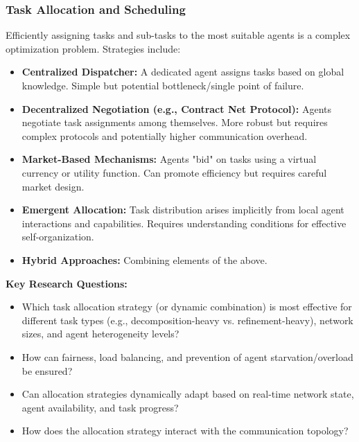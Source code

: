 \documentclass[12pt]{amsart}
\begin{document}
\subsubsection{Task Allocation and Scheduling}
\label{subsubsec:task_allocation}
Efficiently assigning tasks and sub-tasks to the most suitable agents is a complex optimization problem. Strategies include:
\begin{itemize}[leftmargin=*]
    \item \textbf{Centralized Dispatcher:} A dedicated agent assigns tasks based on global knowledge. Simple but potential bottleneck/single point of failure.
    \item \textbf{Decentralized Negotiation (e.g., Contract Net Protocol):} Agents negotiate task assignments among themselves. More robust but requires complex protocols and potentially higher communication overhead.
    \item \textbf{Market-Based Mechanisms:} Agents "bid" on tasks using a virtual currency or utility function. Can promote efficiency but requires careful market design.
    \item \textbf{Emergent Allocation:} Task distribution arises implicitly from local agent interactions and capabilities. Requires understanding conditions for effective self-organization.
    \item \textbf{Hybrid Approaches:} Combining elements of the above.
\end{itemize}
\textbf{Key Research Questions:}
\begin{itemize}[leftmargin=*, label={--}]
    \item Which task allocation strategy (or dynamic combination) is most effective for different task types (e.g., decomposition-heavy vs. refinement-heavy), network sizes, and agent heterogeneity levels?
    \item How can fairness, load balancing, and prevention of agent starvation/overload be ensured?
    \item Can allocation strategies dynamically adapt based on real-time network state, agent availability, and task progress?
    \item How does the allocation strategy interact with the communication topology?
\end{itemize}
\end{document}
